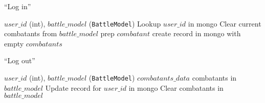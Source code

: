 \begin{algorithm}
\caption{``Log in''}
    \begin{algorithmic}
        \REQUIRE $user\_id$ (int), $battle\_model$ (\texttt{BattleModel})
        \STATE Lookup $user\_id$ in mongo
            \STATE Clear current combatants from $battle\_model$
                \STATE prep $combatant$
            \ENDFOR
        \ELSE
            \STATE create record in mongo with empty $combatants$
        \ENDIF
    \end{algorithmic}
\end{algorithm}

\begin{algorithm}
    \caption{``Log out''}
        \begin{algorithmic}
            \REQUIRE $user\_id$ (int), $battle\_model$ (\texttt{BattleModel})
            \STATE $combatants\_data$ \gets combatants in $battle\_model$
            \STATE Update record for $user\_id$ in mongo
                \THROW
            \ENDIF
            \STATE Clear combatants in $battle\_model$
        \end{algorithmic}
    \end{algorithm}